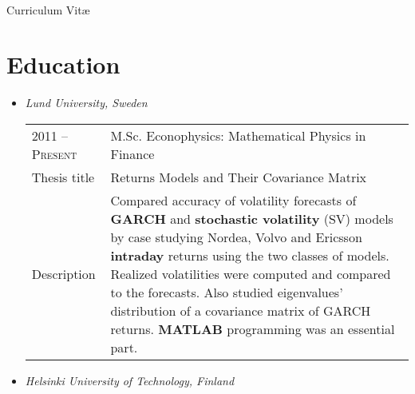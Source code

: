 \documentclass[10pt]{article} %
\begin{document}
\color{text1} %


\par{\\ %
{\color{headings} Curriculum {Vit\ae}\\[15pt]\par} %
	

\begin{minipage}[t]{0.5\textwidth} %

\section{Education} 
\begin{itemize} 
\item \textit{Lund University, Sweden}

\begin{tabular}{l p{}}
  2011 -- \textsc{Present} & {M.Sc. Econophysics: Mathematical
  Physics in Finance} \\
  Thesis title & Returns Models and Their Covariance Matrix \\
  Description & Compared accuracy of volatility forecasts of {\bf
    GARCH} and {\bf stochastic volatility} (SV) models by case
  studying Nordea, Volvo and Ericsson {\bf intraday} returns using the
  two classes of models. Realized volatilities were computed and
  compared to the forecasts. Also studied eigenvalues' distribution of
  a covariance matrix of GARCH returns. {\bf MATLAB} programming was
  an essential part.
\end{tabular}

\item {\it Helsinki University of Technology, Finland}


\end{itemize}
\end{minipage}}
\end{document}
